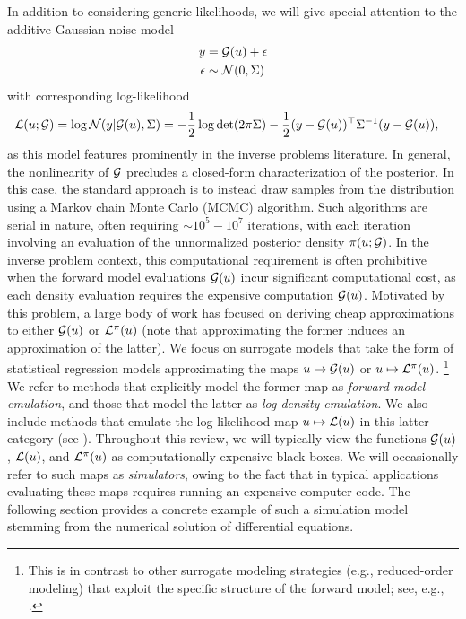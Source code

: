 \documentclass[12pt]{article}
\begin{document}
In addition to considering 
generic likelihoods, we will give special attention to the additive Gaussian noise model
\begin{align}
y &= \mathcal{G}(u) + \epsilon \label{inv_prob_Gaussian} \\
\epsilon &\sim \mathcal{N}(0, \Sigma) \nonumber 
\end{align}
with corresponding log-likelihood 
\begin{align}
\mathcal{L}(u; \mathcal{G}) &= \log\mathcal{N}(y| \mathcal{G}(u), \Sigma) 
= -\frac{1}{2} \log\det (2\pi \Sigma) - \frac{1}{2} (y - \mathcal{G}(u))^\top \Sigma^{-1} (y - \mathcal{G}(u)), \label{llik_Gaussian}
\end{align}
as this model features prominently in the inverse problems literature.
In general, the nonlinearity of $\mathcal{G}$ precludes a closed-form characterization of the posterior. In this case, the 
standard approach is to instead draw samples from the distribution using a Markov chain Monte Carlo (MCMC) 
algorithm. Such algorithms are serial in nature, often requiring $\sim 10^5 - 10^7$ iterations, with each 
iteration involving an evaluation of the unnormalized posterior density $\pi(u; \mathcal{G})$. 
In the inverse problem context, this computational requirement is often prohibitive when the forward model 
evaluations $\mathcal{G}(u)$ incur significant computational cost, as each density evaluation requires the 
expensive computation $\mathcal{G}(u)$. Motivated by this problem, a large body of work has focused on deriving 
cheap approximations to either $\mathcal{G}(u)$ or $\mathcal{L}^{\pi}(u)$ (note that approximating the former induces 
an approximation of the latter). We focus on surrogate models that take the form of statistical 
regression models approximating the maps $u \mapsto \mathcal{G}(u)$ or $u \mapsto \mathcal{L}^{\pi}(u)$.
\footnote{This is in contrast to other surrogate modeling strategies (e.g., reduced-order modeling)
that exploit the specific structure of the forward model; see, e.g., \todo.}
We refer to methods that explicitly model the former map as \textit{forward model emulation}, and those that 
model the latter as \textit{log-density emulation}. We also include methods that emulate the log-likelihood
map $u \mapsto \mathcal{L}(u)$ in this latter category (see ).
Throughout this review, we will typically view the functions
$\mathcal{G}(u)$, $\mathcal{L}(u)$, and $\mathcal{L}^{\pi}(u)$ as computationally expensive black-boxes. We will occasionally refer to 
such maps as \textit{simulators}, owing to the fact that in typical applications evaluating these maps requires
running an expensive computer code. The following section provides a concrete example of such a simulation
model stemming from the numerical solution of differential equations. 
 
\end{document}
